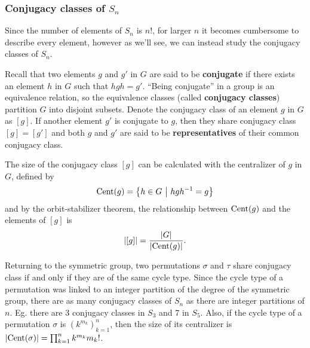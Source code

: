 \subsubsection{Conjugacy classes of $S_n$}

	Since the number of elements of $S_n$ is $n!$, for larger $n$ it becomes cumbersome to describe every element, however as we'll see, we can instead study the conjugacy classes of $S_n$. 
	
	Recall that two elements $g$ and $g'$ in $G$ are said to be \textbf{conjugate} if there exists an element $h$ in $G$ such that $hgh = g'$. ``Being conjugate'' in a group is an equivalence relation, so the equivalence classes (called \textbf{conjugacy classes}) partition $G$ into disjoint subsets. Denote the conjugacy class of an element $g$ in $G$ as $[g]$. If another element $g'$ is conjugate to $g$, then they share conjugacy class $[g] = [g']$ and both $g$ and $g'$ are said to be \textbf{representatives} of their common conjugacy class.
	
	The size of the conjugacy class $[g]$ can be calculated with the centralizer of $g$ in $G$, defined by 
	\[
	\Cent(g) = \left\{ h \in G \ \middle\vert \ hgh^{-1} = g \right\}
	\]
	and by the orbit-stabilizer theorem\cite[Thm 21.3]{Biggs}, the relationship between $\text{Cent}(g)$ and the elements of $[g]$ is
	\[
	|[g]| = \frac{|G|}{|\text{Cent}(g)|}.
	\]
	
	
	Returning to the symmetric group, two permutations $\sigma$ and $\tau$ share conjugacy class if and only if they are of the same cycle type\cite{Sagan}. Since the cycle type of a permutation was linked to an integer partition of the degree of the symmetric group, there are as many conjugacy classes of $S_n$ as there are integer partitions of $n$. Eg. there are 3 conjugacy classes in $S_3$ and 7 in $S_5$. Also, if the cycle type of a permutation $\sigma$ is $(k^{m_k})_{k=1}^n$, then the size of its centralizer is $|\text{Cent}(\sigma)| = \prod_{k=1}^{n} k^{m_k}{m_k}!$\cite[Prop 1.1.1]{Sagan}. 
	
